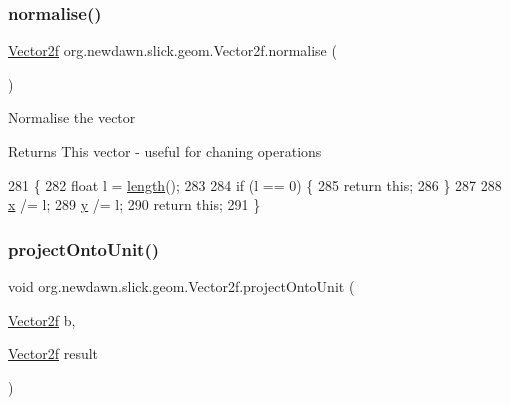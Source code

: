 \subsubsection{\texorpdfstring{normalise()}{normalise()}}
{\footnotesize\ttfamily \mbox{\hyperlink{classorg_1_1newdawn_1_1slick_1_1geom_1_1_vector2f}{Vector2f}} org.\+newdawn.\+slick.\+geom.\+Vector2f.\+normalise (\begin{DoxyParamCaption}{ }\end{DoxyParamCaption})\hspace{0.3cm}{\ttfamily [inline]}}

Normalise the vector

\begin{DoxyReturn}{Returns}
This vector -\/ useful for chaning operations 
\end{DoxyReturn}

\begin{DoxyCode}
281                                 \{
282         \textcolor{keywordtype}{float} l = \mbox{\hyperlink{classorg_1_1newdawn_1_1slick_1_1geom_1_1_vector2f_ada298fe38d235371020523e9655e9152}{length}}();
283         
284         \textcolor{keywordflow}{if} (l == 0) \{
285             \textcolor{keywordflow}{return} \textcolor{keyword}{this};
286         \}
287         
288         \mbox{\hyperlink{classorg_1_1newdawn_1_1slick_1_1geom_1_1_vector2f_a3c72cdf13ebc511a472e1a02002fa579}{x}} /= l;
289         \mbox{\hyperlink{classorg_1_1newdawn_1_1slick_1_1geom_1_1_vector2f_aa03914f0c3d32063aa90e5bd7b74688e}{y}} /= l;
290         \textcolor{keywordflow}{return} \textcolor{keyword}{this};
291     \}
\end{DoxyCode}
\mbox{\label{classorg_1_1newdawn_1_1slick_1_1geom_1_1_vector2f_a801d1bc50a68d7fcab1708506967b502}} 
\subsubsection{\texorpdfstring{project\+Onto\+Unit()}{projectOntoUnit()}}
{\footnotesize\ttfamily void org.\+newdawn.\+slick.\+geom.\+Vector2f.\+project\+Onto\+Unit (\begin{DoxyParamCaption}\item[{\mbox{\hyperlink{classorg_1_1newdawn_1_1slick_1_1geom_1_1_vector2f}{Vector2f}}}]{b,  }\item[{\mbox{\hyperlink{classorg_1_1newdawn_1_1slick_1_1geom_1_1_vector2f}{Vector2f}}}]{result }\end{DoxyParamCaption})\hspace{0.3cm}{\ttfamily [inline]}}

